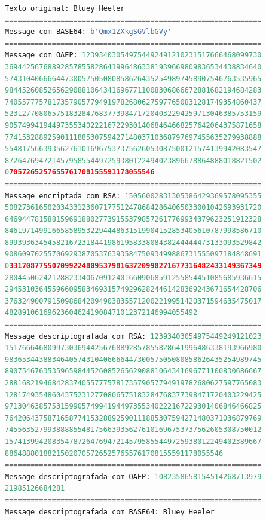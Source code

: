 \documentclass{article}
\begin{document}
\begin{lstlisting}[language=Python, breaklines=true]
Texto original: Bluey Heeler
============================================================
Message com BASE64: b'Qmx1ZXkgSGVlbGVy'
============================================================
Message com OAEP: 123934030549754492491210231517666468099730
369442567688928578558286419964863381939669809836534438834640
574310406666447300575050808586264352549897458907546763535965
984452608526562908810643416967711008306866672881682194684283
740557775781735790577949197826806275977650831281749354860437
523127708065751832847683773984717204032294259713046385753159
905749941944973553402221672293014068464668257642064375871658
774153288925901118853075942714803710368797697455635279938888
554817566393562761016967537375626053087500121574139942083547
872647694721457958554497259380122494023896678864888018821502
07057265257655761708155591178055546
============================================================
Message encriptada com RSA: 15056002831305386429369578095355
508273616502034331236071775124786842864065033001042693931720
646944781588159691880277391553798572617769934379623251912328
846197149916658589532294448631519904152853405610787998586710
899393634545821672318441986195833808438244444473133093529842
908609702557069293870537639358475093499886731555097184848691
033170877550709922480953798163720998271677316482433149367349
280445062421288233406709124016609068591255854451085685936615
294531036455966095834693157492962824461428369243671654428706
376324900791509868420949038355712002219951420371594635475017
482891061696236046241908471012372146994055492
============================================================
Message descriptografada com RSA: 12393403054975449249121023
151766646809973036944256768892857855828641996486338193966980
983653443883464057431040666644730057505080858626435254989745
890754676353596598445260852656290881064341696771100830686667
288168219468428374055777578173579057794919782680627597765083
128174935486043752312770806575183284768377398471720403229425
971304638575315990574994194497355340222167229301406846466825
764206437587165877415328892590111885307594271480371036879769
745563527993888855481756639356276101696753737562605308750012
157413994208354787264769472145795855449725938012249402389667
886488801882150207057265257655761708155591178055546
============================================================
Message descriptografada com OAEP: 1082358658154514268713979
21985126684281
============================================================
Message descriptografada com BASE64: Bluey Heeler

\end{lstlisting}
\end{document}
